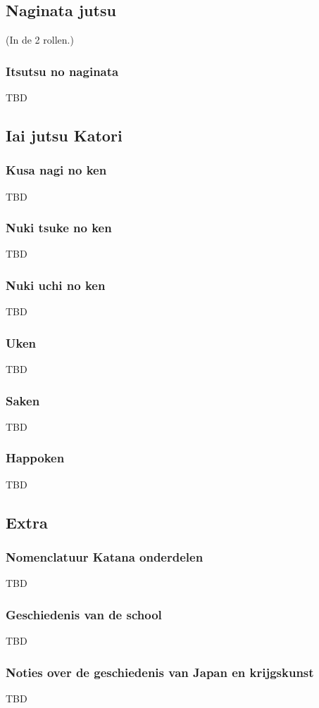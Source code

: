 \subsection{Naginata jutsu}
(In de 2 rollen.)

\subsubsection{Itsutsu no naginata}

TBD

\subsection{Iai jutsu Katori}

\subsubsection{Kusa nagi no ken}

TBD

\subsubsection{Nuki tsuke no ken}

TBD

\subsubsection{Nuki uchi no ken}

TBD

\subsubsection{Uken}

TBD

\subsubsection{Saken}

TBD

\subsubsection{Happoken}

TBD

\subsection{Extra}

\subsubsection{Nomenclatuur Katana onderdelen}

TBD

\subsubsection{Geschiedenis van de school}

TBD

\subsubsection{Noties over de geschiedenis van Japan en krijgskunst}

TBD
